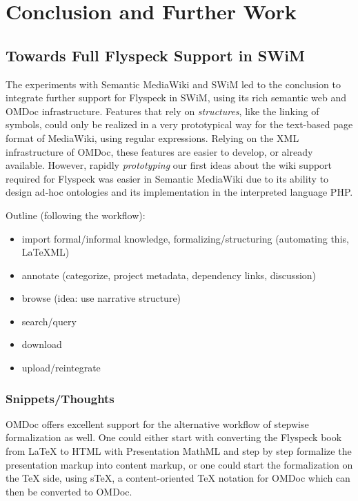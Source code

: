 
\section{Conclusion and Further Work}
\label{sec:conc}

\subsection{Towards Full Flyspeck Support in SWiM}
\label{sec:flyspeck-swim}

The experiments with Semantic MediaWiki and SWiM led to the conclusion to
integrate further support for Flyspeck in SWiM, using its rich semantic web and
OMDoc infrastructure.  Features that rely on \emph{structures}, like the linking
of symbols, could only be realized in a very prototypical way for the text-based
page format of MediaWiki, using regular expressions.  Relying on the XML
infrastructure of OMDoc, these features are easier to develop, or already
available.  However, rapidly \emph{prototyping} our first ideas about the wiki
support required for Flyspeck was easier in Semantic MediaWiki due to its
ability to design ad-hoc ontologies and its implementation in the interpreted
language PHP.

Outline (following the workflow):
\begin{itemize}
\item import formal/informal knowledge, formalizing/structuring (automating
  this, LaTeXML)
\item annotate (categorize, project metadata, dependency links, discussion)
\item browse (idea: use narrative structure)
\item search/query
\item download
\item upload/reintegrate
\end{itemize}

\subsubsection{Snippets/Thoughts}

OMDoc offers excellent support for the alternative workflow of stepwise
formalization as well\cite[chap.\ 4]{Kohlhase:omdoc1.2}.  One could either start
with converting the Flyspeck book from {\LaTeX} to HTML with Presentation MathML
and step by step formalize the presentation markup into content markup, or one
could start the formalization on the {\TeX} side, using s\TeX{}, a
content-oriented {\TeX} notation for OMDoc which can then be converted to
OMDoc\cite{Kohlhase:albwo06}.

